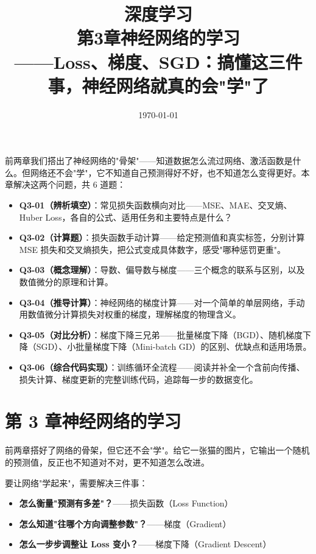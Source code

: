 \documentclass[a4paper,11pt]{ctexart}
\title{\textbf{深度学习\\第3章\quad 神经网络的学习}\\[0.5em]
{\large\color{gray}——Loss、梯度、SGD：搞懂这三件事，神经网络就真的会"学"了}}
\date{\today}
\begin{document}
\maketitle

\begin{beginnerbox}
    前两章我们搭出了神经网络的"骨架"——知道数据怎么流过网络、激活函数是什么。但网络还不会"学"，它不知道自己预测得好不好，也不知道怎么变得更好。本章解决这两个问题，共 6 道题：

    \begin{itemize}
        \item \textbf{Q3-01（辨析填空）}：常见损失函数横向对比——MSE、MAE、交叉熵、Huber Loss，各自的公式、适用任务和主要特点是什么？
        \item \textbf{Q3-02（计算题）}：损失函数手动计算——给定预测值和真实标签，分别计算 MSE 损失和交叉熵损失，把公式变成具体数字，感受"哪种惩罚更重"。
        \item \textbf{Q3-03（概念理解）}：导数、偏导数与梯度——三个概念的联系与区别，以及数值微分的原理和计算。
        \item \textbf{Q3-04（推导计算）}：神经网络的梯度计算——对一个简单的单层网络，手动用数值微分计算损失对权重的梯度，理解梯度的物理含义。
        \item \textbf{Q3-05（对比分析）}：梯度下降三兄弟——批量梯度下降（BGD）、随机梯度下降（SGD）、小批量梯度下降（Mini-batch GD）的区别、优缺点和适用场景。
        \item \textbf{Q3-06（综合代码实现）}：训练循环全流程——阅读并补全一个含前向传播、损失计算、梯度更新的完整训练代码，追踪每一步的数据变化。
    \end{itemize}
\end{beginnerbox}

\section{第 3 章\quad 神经网络的学习}

前两章搭好了网络的骨架，但它还不会"学"。给它一张猫的图片，它输出一个随机的预测值，反正也不知道对不对，更不知道怎么改进。

要让网络"学起来"，需要解决三件事：

\begin{itemize}
    \item \textbf{怎么衡量"预测有多差"？}——损失函数（Loss Function）
    \item \textbf{怎么知道"往哪个方向调整参数"？}——梯度（Gradient）
    \item \textbf{怎么一步步调整让 Loss 变小？}——梯度下降（Gradient Descent）
\end{itemize}
\end{document}
